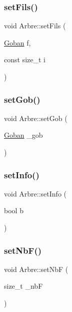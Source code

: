\subsubsection{\texorpdfstring{set\+Fils()}{setFils()}}
{\footnotesize\ttfamily void Arbre\+::set\+Fils (\begin{DoxyParamCaption}\item[{\hyperlink{class_goban}{Goban}}]{f,  }\item[{const size\+\_\+t}]{i }\end{DoxyParamCaption})}

\mbox{\label{class_arbre_a36267e74d40f509fd63b99fe6d8dae0b}} 
\subsubsection{\texorpdfstring{set\+Gob()}{setGob()}}
{\footnotesize\ttfamily void Arbre\+::set\+Gob (\begin{DoxyParamCaption}\item[{\hyperlink{class_goban}{Goban}}]{\+\_\+gob }\end{DoxyParamCaption})}

\mbox{\label{class_arbre_a051e5328c63ba7ab6f6359f9f2f77105}} 
\subsubsection{\texorpdfstring{set\+Info()}{setInfo()}}
{\footnotesize\ttfamily void Arbre\+::set\+Info (\begin{DoxyParamCaption}\item[{bool}]{b }\end{DoxyParamCaption})}

\mbox{\label{class_arbre_acabc45692262e5ca9c2f7b410ddcd373}} 
\subsubsection{\texorpdfstring{set\+Nb\+F()}{setNbF()}}
{\footnotesize\ttfamily void Arbre\+::set\+NbF (\begin{DoxyParamCaption}\item[{size\+\_\+t}]{\+\_\+nbF }\end{DoxyParamCaption})}

